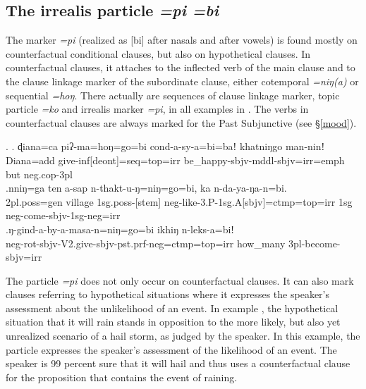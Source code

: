 \subsection{The irrealis particle \emph{=pi \ti =bi}}

The marker \emph{=pi} (realized as [bi] after nasals and after vowels) is  found mostly on counterfactual conditional clauses, but also on hypothetical clauses. In counterfactual clauses, it attaches to the inflected verb of the main clause and to the clause linkage marker of the subordinate clause, either cotemporal \emph{=niŋ(a)} or sequential  \emph{=hoŋ}.  There  actually are sequences of clause linkage marker, topic particle \emph{=ko} and irrealis marker \emph{=pi}, in all examples in \Next. The verbs in counterfactual clauses are always marked for the Past Subjunctive (see §\ref{mood}).
	
	\ex. \ag. ɖiana=ca  piʔ-ma=hoŋ=go=bi   cond-a-sy-a=bi=baǃ khatniŋgo man-ninǃ\\
	Diana{\sc =add} give{\sc -inf[deont]=seq=top=irr} be\_happy{\sc [3sg]-sbjv-mddl-sbjv=irr=emph} but {\sc neg.cop-3pl}\\
	\bg.nniŋ=ga ten a-sap n-thakt-u-ŋ=niŋ=go=bi, ka n-da-ya-ŋa-n=bi.\\
	{\sc 2pl.poss=gen} village {\sc 1sg.poss-[stem]} {\sc neg-}like{\sc -3.P-1sg.A[sbjv]=ctmp=top=irr} {\sc 1sg} {\sc neg-}come{\sc -sbjv-1sg-neg=irr}\\
	\bg.ŋ-gind-a-by-a-masa-n=niŋ=go=bi ikhiŋ n-leks-a=biǃ\\
	{\sc neg-}rot{\sc -sbjv-V2.give-sbjv-pst.prf-neg=ctmp=top=irr} how\_many {\sc 3pl-}become{\sc -sbjv=irr}\\
	 
	
The particle \emph{=pi} does not only occur on counterfactual clauses. It can also mark clauses referring to hypothetical situations where it expresses the speaker's assessment about the unlikelihood of an event. In example \Next, the hypothetical situation that it will rain stands in opposition to the more likely, but also yet unrealized scenario of a hail storm, as judged by the speaker. In this example, the particle expresses the speaker's assessment of the likelihood of an event. The speaker is 99 percent sure that it will hail and thus uses a  counterfactual clause for  the proposition that contains the event of raining. 

